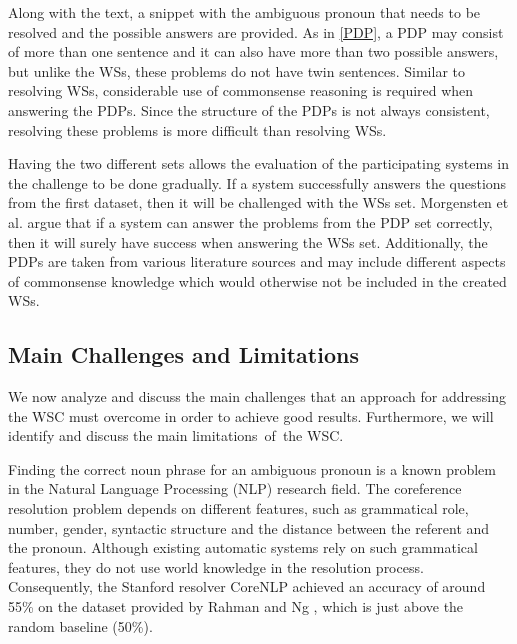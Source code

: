 Along with the text, a snippet with the ambiguous pronoun that needs to be resolved and the possible answers are provided. As in \ref{PDP}, a PDP may consist of more than one sentence and it can also have more than two possible answers, but unlike the WSs, these problems do not have twin sentences. Similar to resolving WSs, considerable use of commonsense reasoning is required when answering the PDPs. Since the structure of the PDPs is not always consistent, resolving these problems is more difficult than resolving WSs.

Having the two different sets allows the evaluation of the participating systems in the challenge to be done gradually. 
If a system successfully answers the questions from the first dataset, then it will be challenged with the WSs set. Morgensten et al. \cite{DBLP:journals/aim/MorgensternDO16} argue that if a system can answer the problems from the PDP set correctly, then it will surely have success when answering the WSs set.  
Additionally, the PDPs are taken from various literature sources and may include different aspects of commonsense knowledge which would otherwise not be included in the created WSs. 

\begin{comment}
Since the idea of the authors of the WSC was to construct this challenge as an alternative to the Turing test, it can be observed that indeed it captures the main characteristics of a Turing test: 

\begin{itemize}
	\item it requires the subject to respond on a non-domain specific set of English sentences
	\item it is easy to solve by native English speakers
	\item to pass successfully the test, the subject has to think
\end{itemize}
\end{comment}


\subsection{Main Challenges and Limitations}
We now analyze and discuss the main challenges that an approach for addressing the WSC must overcome in order to achieve good results. Furthermore, we will identify and discuss the main limitations~of~the WSC. 

Finding the correct noun phrase for an ambiguous pronoun is a known problem in the Natural Language Processing (NLP) research field. The coreference resolution problem depends on different features, such as grammatical role, number, gender, syntactic structure and the distance between the referent and the pronoun. Although existing automatic systems rely on such grammatical features, they do not use world knowledge in the resolution process. Consequently, the Stanford resolver CoreNLP \cite{lee11conllst} achieved an accuracy of around 55\% on the dataset provided by Rahman and Ng \cite{DBLP:conf/emnlp/RahmanN12}, which is just above the random baseline (50\%).
	
